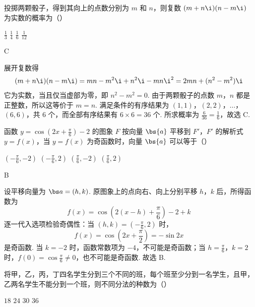 \begin{problem}
投掷两颗骰子，得到其向上的点数分别为 \(m\) 和 \(n\)，则复数 \( (m + n\i)(n - m\i) \) 为实数的概率为（\quad）

\choices
    {\(\frac{1}{3}\)}
    {\(\frac{1}{4}\)}
    {\(\frac{1}{6}\)}
    {\(\frac{1}{12}\)}
\end{problem}

\begin{answer}
C
\end{answer}

\begin{solution}
展开复数得
\[
(m+n\i)(n-m\i)=mn-m^{2}\i+n^{2}\i-mn\i^{2}=2mn+(n^{2}-m^{2})\i
\]
它为实数，当且仅当虚部为零，即 \(n^{2}-m^{2}=0\). 由于两颗骰子的点数 \(m\)，\(n\) 都是正整数，所以这等价于 \(m=n\). 满足条件的有序结果为 \((1,1)\)，\((2,2)\)，\(\ldots\)，\((6,6)\)，共 \(6\) 个，而全部有序结果有 \(6\times6=36\) 个. 所求概率为 \(\frac{6}{36}=\frac16\)，故选 C.
\end{solution}

\begin{problem}
函数 \( y = \cos \left(2x + \frac{\pi}{6}\right) - 2 \) 的图象 \(F\) 按向量 \(\bs{a}\) 平移到 \(F'\)，\(F'\) 的解析式 \( y = f(x) \)，当 \( y = f(x) \) 为奇函数时，向量 \(\bs{a}\) 可以等于（\quad）

\choices
    {\(\left(-\frac{\pi}{6}, -2\right)\)}
    {\(\left(-\frac{\pi}{6}, 2\right)\)}
    {\(\left(\frac{\pi}{6}, -2\right)\)}
    {\(\left(\frac{\pi}{6}, 2\right)\)}
\end{problem}

\begin{answer}
B
\end{answer}

\begin{solution}
设平移向量为 \(\bs a=(h,k)\). 原图象上的点向右、向上分别平移 \(h\)，\(k\) 后，所得函数为
\[
f(x)=\cos\left(2(x-h)+\frac{\pi}{6}\right)-2+k
\]
逐一代入选项检验奇偶性：当 \((h,k)=\left(-\frac\pi6,2\right)\) 时，
\[
f(x)=\cos\left(2x+\frac\pi2\right)=-\sin2x
\]
是奇函数. 当 \(k=-2\) 时，函数常数项为 \(-4\)，不可能是奇函数；当 \(h=\frac\pi6\)，\(k=2\) 时，\(f(0)=\cos\frac\pi6\ne0\)，也不可能是奇函数. 故选 B.
\end{solution}

\begin{problem}
将甲，乙，丙，丁四名学生分到三个不同的班，每个班至少分到一名学生，且甲，乙两名学生不能分到一个班，则不同分法的种数为（\quad）

\choices
    {\(18\)}
    {\(24\)}
    {\(30\)}
    {\(36\)}
\end{problem}

